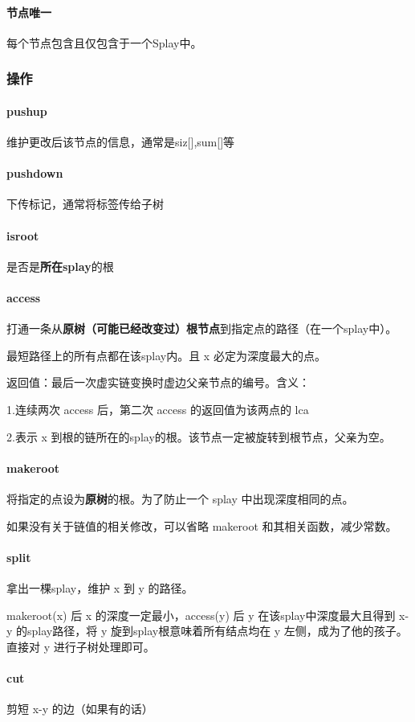 \documentclass[a4paper,11pt]{article}
\begin{document}
\paragraph{节点唯一}
每个节点包含且仅包含于一个Splay中。
\subsubsection{操作}
\paragraph{pushup}
维护更改后该节点的信息，通常是siz[],sum[]等
\paragraph{pushdown}
下传标记，通常将标签传给子树
\paragraph{isroot}
是否是\textbf{所在splay}的根
\paragraph{access}
打通一条从\textbf{原树（可能已经改变过）根节点}到指定点的路径（在一个splay中）。

最短路径上的所有点都在该splay内。且 x 必定为深度最大的点。

返回值：最后一次虚实链变换时虚边父亲节点的编号。含义：

1.连续两次 access 后，第二次 access 的返回值为该两点的 lca

2.表示 x 到根的链所在的splay的根。该节点一定被旋转到根节点，父亲为空。
\paragraph{makeroot}
将指定的点设为\textbf{原树}的根。为了防止一个 splay 中出现深度相同的点。

如果没有关于链值的相关修改，可以省略 makeroot 和其相关函数，减少常数。
\paragraph{split}
拿出一棵splay，维护 x 到 y 的路径。

makeroot(x) 后 x 的深度一定最小，access(y) 后 y 在该splay中深度最大且得到 x-y 的splay路径，将 y 旋到splay根意味着所有结点均在 y 左侧，成为了他的孩子。直接对 y 进行子树处理即可。
\paragraph{cut}
剪短 x-y 的边（如果有的话）
\end{document}

